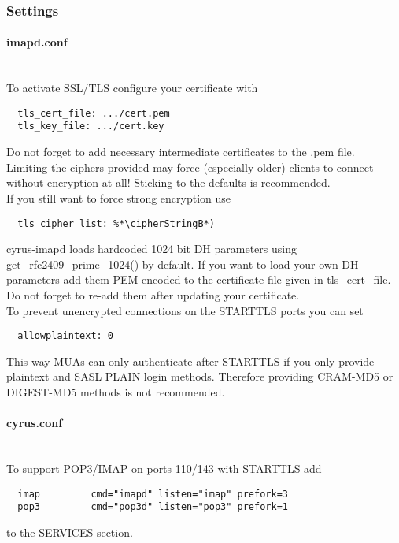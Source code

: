 \subsubsection{Settings}
\paragraph*{imapd.conf}\mbox{}\\

To activate SSL/TLS configure your certificate with
\begin{lstlisting}
  tls_cert_file: .../cert.pem
  tls_key_file: .../cert.key
\end{lstlisting}

Do not forget to add necessary intermediate certificates to the .pem file.\\

Limiting the ciphers provided may force (especially older) clients to connect without encryption at all! Sticking to the defaults is recommended.\\

If you still want to force strong encryption use
\begin{lstlisting}
  tls_cipher_list: %*\cipherStringB*)
\end{lstlisting}

cyrus-imapd loads hardcoded 1024 bit DH parameters using get\_rfc2409\_prime\_1024() by default. If you want to load your own DH parameters add them PEM encoded to the certificate file given in tls\_cert\_file. Do not forget to re-add them after updating your certificate.\\

To prevent unencrypted connections on the STARTTLS ports you can set
\begin{lstlisting}
  allowplaintext: 0
\end{lstlisting}
This way MUAs can only authenticate after STARTTLS if you only provide plaintext and SASL PLAIN login methods. Therefore providing CRAM-MD5 or DIGEST-MD5 methods is not recommended.\\

\paragraph*{cyrus.conf}\mbox{}\\

To support POP3/IMAP on ports 110/143 with STARTTLS add
\begin{lstlisting}
  imap         cmd="imapd" listen="imap" prefork=3
  pop3         cmd="pop3d" listen="pop3" prefork=1
\end{lstlisting}
to the SERVICES section.\\

